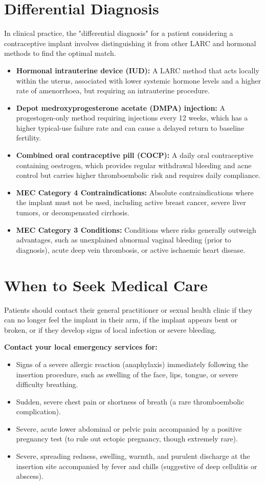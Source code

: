 \section*{Differential Diagnosis}
In clinical practice, the "differential diagnosis" for a patient considering a contraceptive implant involves distinguishing it from other LARC and hormonal methods to find the optimal match.

\begin{itemize}
    \item \textbf{Hormonal intrauterine device (IUD):} A LARC method that acts locally within the uterus, associated with lower systemic hormone levels and a higher rate of amenorrhoea, but requiring an intrauterine procedure.
    \item \textbf{Depot medroxyprogesterone acetate (DMPA) injection:} A progestogen-only method requiring injections every 12 weeks, which has a higher typical-use failure rate and can cause a delayed return to baseline fertility.
    \item \textbf{Combined oral contraceptive pill (COCP):} A daily oral contraceptive containing oestrogen, which provides regular withdrawal bleeding and acne control but carries higher thromboembolic risk and requires daily compliance.
    \item \textbf{MEC Category 4 Contraindications:} Absolute contraindications where the implant must not be used, including active breast cancer, severe liver tumors, or decompensated cirrhosis.
    \item \textbf{MEC Category 3 Conditions:} Conditions where risks generally outweigh advantages, such as unexplained abnormal vaginal bleeding (prior to diagnosis), acute deep vein thrombosis, or active ischaemic heart disease.
\end{itemize}

\section*{When to Seek Medical Care}
Patients should contact their general practitioner or sexual health clinic if they can no longer feel the implant in their arm, if the implant appears bent or broken, or if they develop signs of local infection or severe bleeding.

\textbf{Contact your local emergency services for:}
\begin{itemize}
    \item Signs of a severe allergic reaction (anaphylaxis) immediately following the insertion procedure, such as swelling of the face, lips, tongue, or severe difficulty breathing.
    \item Sudden, severe chest pain or shortness of breath (a rare thromboembolic complication).
    \item Severe, acute lower abdominal or pelvic pain accompanied by a positive pregnancy test (to rule out ectopic pregnancy, though extremely rare).
    \item Severe, spreading redness, swelling, warmth, and purulent discharge at the insertion site accompanied by fever and chills (suggestive of deep cellulitis or abscess).
\end{itemize}

